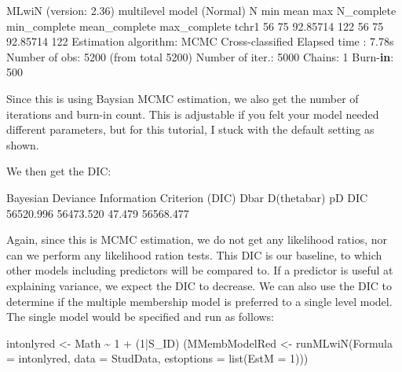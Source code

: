 \documentclass[
]{book}
\newenvironment{Shaded}{\begin{snugshade}}{\end{snugshade}}
\newcommand{\AttributeTok}[1]{\textcolor[rgb]{0.77,0.63,0.00}{#1}}
\newcommand{\ControlFlowTok}[1]{\textcolor[rgb]{0.13,0.29,0.53}{\textbf{#1}}}
\newcommand{\DecValTok}[1]{\textcolor[rgb]{0.00,0.00,0.81}{#1}}
\newcommand{\FloatTok}[1]{\textcolor[rgb]{0.00,0.00,0.81}{#1}}
\newcommand{\FunctionTok}[1]{\textcolor[rgb]{0.00,0.00,0.00}{#1}}
\newcommand{\NormalTok}[1]{#1}
\newcommand{\OtherTok}[1]{\textcolor[rgb]{0.56,0.35,0.01}{#1}}
\newcommand{\SpecialCharTok}[1]{\textcolor[rgb]{0.00,0.00,0.00}{#1}}
\begin{document}
\begin{Shaded}
\begin{Highlighting}[]
\FunctionTok{MLwiN}\NormalTok{ (version}\SpecialCharTok{:} \FloatTok{2.36}\NormalTok{)  multilevel }\FunctionTok{model}\NormalTok{ (Normal) }
\NormalTok{       N min     mean max N\_complete min\_complete mean\_complete max\_complete}
\NormalTok{tchr1 }\DecValTok{56}  \DecValTok{75} \FloatTok{92.85714} \DecValTok{122}         \DecValTok{56}           \DecValTok{75}      \FloatTok{92.85714}          \DecValTok{122}
\NormalTok{Estimation algorithm}\SpecialCharTok{:}\NormalTok{  MCMC      Cross}\SpecialCharTok{{-}}\NormalTok{classified              Elapsed time }\SpecialCharTok{:} \FloatTok{7.78}\NormalTok{s }
\NormalTok{Number of obs}\SpecialCharTok{:}  \DecValTok{5200}\NormalTok{ (from total }\DecValTok{5200}\NormalTok{)          Number of iter.}\SpecialCharTok{:} \DecValTok{5000}\NormalTok{  Chains}\SpecialCharTok{:} \DecValTok{1}\NormalTok{  Burn}\SpecialCharTok{{-}}\ControlFlowTok{in}\SpecialCharTok{:} \DecValTok{500}  
\end{Highlighting}
\end{Shaded}

Since this is using Baysian MCMC estimation, we also get the number of iterations and burn-in count. This is adjustable if you felt your model needed different parameters, but for this tutorial, I stuck with the default setting as shown.

We then get the DIC:

\begin{Shaded}
\begin{Highlighting}[]
\NormalTok{Bayesian Deviance Information }\FunctionTok{Criterion}\NormalTok{ (DIC)}
\NormalTok{Dbar      }\FunctionTok{D}\NormalTok{(thetabar)    pD      DIC}
\FloatTok{56520.996}  \FloatTok{56473.520}  \FloatTok{47.479}     \FloatTok{56568.477}  
\end{Highlighting}
\end{Shaded}

Again, since this is MCMC estimation, we do not get any likelihood ratios, nor can we perform any likelihood ration tests. This DIC is our baseline, to which other models including predictors will be compared to. If a predictor is useful at explaining variance, we expect the DIC to decrease. We can also use the DIC to determine if the multiple membership model is preferred to a single level model. The single model would be specified and run as follows:

\begin{Shaded}
\begin{Highlighting}[]
\NormalTok{intonlyred }\OtherTok{\textless{}{-}}\NormalTok{ Math }\SpecialCharTok{\textasciitilde{}} \DecValTok{1} \SpecialCharTok{+}\NormalTok{ (}\DecValTok{1}\SpecialCharTok{|}\NormalTok{S\_ID)}
\NormalTok{(MMembModelRed }\OtherTok{\textless{}{-}} \FunctionTok{runMLwiN}\NormalTok{(}\AttributeTok{Formula =}\NormalTok{ intonlyred, }\AttributeTok{data =}\NormalTok{ StudData, }\AttributeTok{estoptions =} \FunctionTok{list}\NormalTok{(}\AttributeTok{EstM =} \DecValTok{1}\NormalTok{)))}
\end{Highlighting}
\end{Shaded}
\end{document}
